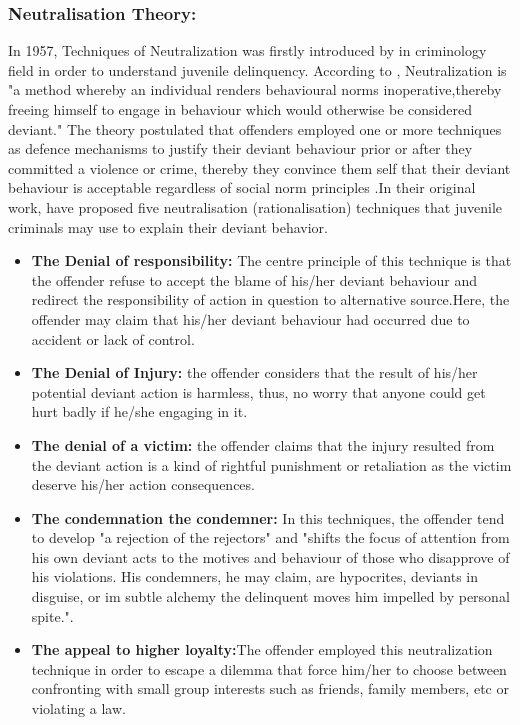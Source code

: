 \subsubsection{Neutralisation Theory:}
In 1957, Techniques of Neutralization was firstly introduced by \citet{Sykes1957} in criminology field in order to understand juvenile delinquency. According to \cite{Rogers1974}, Neutralization is "a method whereby an individual renders behavioural norms inoperative,thereby freeing himself to engage in behaviour which would otherwise be considered deviant." The theory postulated that offenders employed one or more techniques as defence mechanisms to justify their deviant behaviour prior or after they committed a violence or crime, thereby they convince them self that their deviant behaviour is acceptable regardless of social norm principles \cite{Teh2015}.In their original work, \citet{Sykes1957}have proposed five neutralisation (rationalisation) techniques that juvenile criminals may use to explain their deviant behavior.  
\begin{itemize}
\item \textbf{The Denial of responsibility:} The centre principle of this technique is that the offender refuse to accept the blame of his/her deviant behaviour and redirect the responsibility of action in question to alternative source.Here, the offender may claim that his/her deviant behaviour had occurred due to accident or lack of control\cite{Sykes1957}.   
\item \textbf{The Denial of Injury:} the offender considers that the result of his/her potential deviant action is harmless, thus, no worry that anyone could get hurt badly if he/she engaging in it\cite{Sykes1957}. 
\item \textbf{The denial of a victim:} the offender claims that the injury resulted from the deviant action is a kind of rightful punishment or retaliation as the victim deserve his/her action consequences\cite{Sykes1957}.   
\item \textbf{The condemnation the condemner:} In this techniques, the offender tend to develop "a rejection of the rejectors" and "shifts the focus of attention from his own deviant acts to the motives and behaviour of those who disapprove of his violations. His condemners, he may claim, are hypocrites, deviants in disguise, or im subtle alchemy the delinquent moves him impelled by personal spite."\cite{Sykes1957}.
\item \textbf{The appeal to higher loyalty:}The offender employed this neutralization technique in order to escape a dilemma that force him/her to choose between confronting with small group interests such as friends, family members, etc or violating a law\cite{Sykes1957}.    
\end{itemize}
